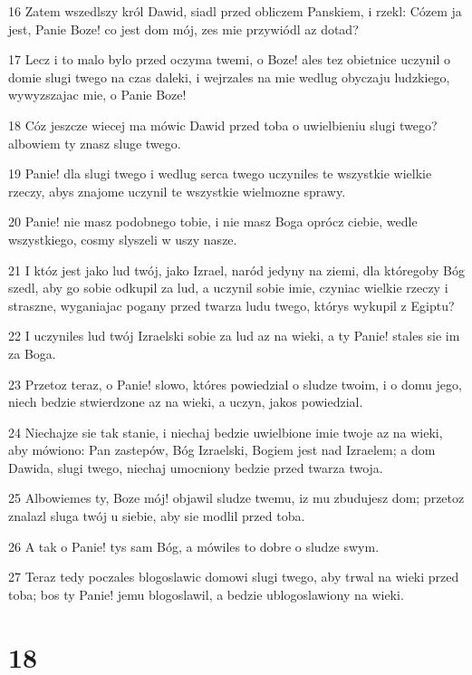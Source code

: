 \par 16 Zatem wszedlszy król Dawid, siadl przed obliczem Panskiem, i rzekl: Cózem ja jest, Panie Boze! co jest dom mój, zes mie przywiódl az dotad?
\par 17 Lecz i to malo bylo przed oczyma twemi, o Boze! ales tez obietnice uczynil o domie slugi twego na czas daleki, i wejrzales na mie wedlug obyczaju ludzkiego, wywyzszajac mie, o Panie Boze!
\par 18 Cóz jeszcze wiecej ma mówic Dawid przed toba o uwielbieniu slugi twego? albowiem ty znasz sluge twego.
\par 19 Panie! dla slugi twego i wedlug serca twego uczyniles te wszystkie wielkie rzeczy, abys znajome uczynil te wszystkie wielmozne sprawy.
\par 20 Panie! nie masz podobnego tobie, i nie masz Boga oprócz ciebie, wedle wszystkiego, cosmy slyszeli w uszy nasze.
\par 21 I któz jest jako lud twój, jako Izrael, naród jedyny na ziemi, dla któregoby Bóg szedl, aby go sobie odkupil za lud, a uczynil sobie imie, czyniac wielkie rzeczy i straszne, wyganiajac pogany przed twarza ludu twego, którys wykupil z Egiptu?
\par 22 I uczyniles lud twój Izraelski sobie za lud az na wieki, a ty Panie! stales sie im za Boga.
\par 23 Przetoz teraz, o Panie! slowo, któres powiedzial o sludze twoim, i o domu jego, niech bedzie stwierdzone az na wieki, a uczyn, jakos powiedzial.
\par 24 Niechajze sie tak stanie, i niechaj bedzie uwielbione imie twoje az na wieki, aby mówiono: Pan zastepów, Bóg Izraelski, Bogiem jest nad Izraelem; a dom Dawida, slugi twego, niechaj umocniony bedzie przed twarza twoja.
\par 25 Albowiemes ty, Boze mój! objawil sludze twemu, iz mu zbudujesz dom; przetoz znalazl sluga twój u siebie, aby sie modlil przed toba.
\par 26 A tak o Panie! tys sam Bóg, a mówiles to dobre o sludze swym.
\par 27 Teraz tedy poczales blogoslawic domowi slugi twego, aby trwal na wieki przed toba; bos ty Panie! jemu blogoslawil, a bedzie ublogoslawiony na wieki.

\chapter{18}

